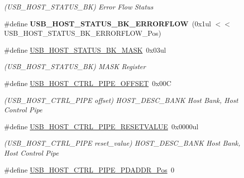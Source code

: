 \begin{DoxyCompactItemize}
\begin{DoxyCompactList}\small\item\em (U\+S\+B\+\_\+\+H\+O\+S\+T\+\_\+\+S\+T\+A\+T\+U\+S\+\_\+\+B\+K) Error Flow Status \end{DoxyCompactList}\item 
\hypertarget{group___s_a_m_l21___u_s_b_ga55212f889dacd0bef5af2149aff1a368}{}\#define {\bfseries U\+S\+B\+\_\+\+H\+O\+S\+T\+\_\+\+S\+T\+A\+T\+U\+S\+\_\+\+B\+K\+\_\+\+E\+R\+R\+O\+R\+F\+L\+O\+W}~(0x1ul $<$$<$ U\+S\+B\+\_\+\+H\+O\+S\+T\+\_\+\+S\+T\+A\+T\+U\+S\+\_\+\+B\+K\+\_\+\+E\+R\+R\+O\+R\+F\+L\+O\+W\+\_\+\+Pos)\label{group___s_a_m_l21___u_s_b_ga55212f889dacd0bef5af2149aff1a368}

\item 
\hypertarget{group___s_a_m_l21___u_s_b_ga2cbf893bf5b3ddc9f8f5017de44b76d1}{}\#define \hyperlink{group___s_a_m_l21___u_s_b_ga2cbf893bf5b3ddc9f8f5017de44b76d1}{U\+S\+B\+\_\+\+H\+O\+S\+T\+\_\+\+S\+T\+A\+T\+U\+S\+\_\+\+B\+K\+\_\+\+M\+A\+S\+K}~0x03ul\label{group___s_a_m_l21___u_s_b_ga2cbf893bf5b3ddc9f8f5017de44b76d1}

\begin{DoxyCompactList}\small\item\em (U\+S\+B\+\_\+\+H\+O\+S\+T\+\_\+\+S\+T\+A\+T\+U\+S\+\_\+\+B\+K) M\+A\+S\+K Register \end{DoxyCompactList}\item 
\hypertarget{group___s_a_m_l21___u_s_b_ga699b7627c69a2e077849a7482d2d0c0e}{}\#define \hyperlink{group___s_a_m_l21___u_s_b_ga699b7627c69a2e077849a7482d2d0c0e}{U\+S\+B\+\_\+\+H\+O\+S\+T\+\_\+\+C\+T\+R\+L\+\_\+\+P\+I\+P\+E\+\_\+\+O\+F\+F\+S\+E\+T}~0x00\+C\label{group___s_a_m_l21___u_s_b_ga699b7627c69a2e077849a7482d2d0c0e}

\begin{DoxyCompactList}\small\item\em (U\+S\+B\+\_\+\+H\+O\+S\+T\+\_\+\+C\+T\+R\+L\+\_\+\+P\+I\+P\+E offset) H\+O\+S\+T\+\_\+\+D\+E\+S\+C\+\_\+\+B\+A\+N\+K Host Bank, Host Control Pipe \end{DoxyCompactList}\item 
\hypertarget{group___s_a_m_l21___u_s_b_ga7756bd851dfff7295baaab22792506e6}{}\#define \hyperlink{group___s_a_m_l21___u_s_b_ga7756bd851dfff7295baaab22792506e6}{U\+S\+B\+\_\+\+H\+O\+S\+T\+\_\+\+C\+T\+R\+L\+\_\+\+P\+I\+P\+E\+\_\+\+R\+E\+S\+E\+T\+V\+A\+L\+U\+E}~0x0000ul\label{group___s_a_m_l21___u_s_b_ga7756bd851dfff7295baaab22792506e6}

\begin{DoxyCompactList}\small\item\em (U\+S\+B\+\_\+\+H\+O\+S\+T\+\_\+\+C\+T\+R\+L\+\_\+\+P\+I\+P\+E reset\+\_\+value) H\+O\+S\+T\+\_\+\+D\+E\+S\+C\+\_\+\+B\+A\+N\+K Host Bank, Host Control Pipe \end{DoxyCompactList}\item 
\hypertarget{group___s_a_m_l21___u_s_b_ga9cd5539debbbaaab60a622e533592b44}{}\#define \hyperlink{group___s_a_m_l21___u_s_b_ga9cd5539debbbaaab60a622e533592b44}{U\+S\+B\+\_\+\+H\+O\+S\+T\+\_\+\+C\+T\+R\+L\+\_\+\+P\+I\+P\+E\+\_\+\+P\+D\+A\+D\+D\+R\+\_\+\+Pos}~0\label{group___s_a_m_l21___u_s_b_ga9cd5539debbbaaab60a622e533592b44}


\end{DoxyCompactItemize}
